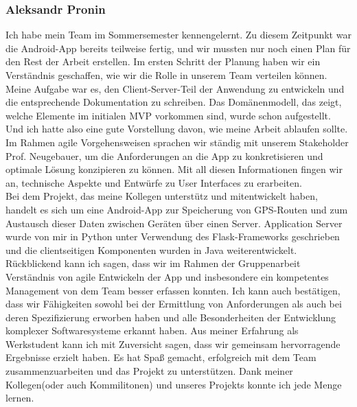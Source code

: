 \documentclass{article}
\begin{document}
\subsubsection{Aleksandr Pronin}
    Ich habe mein Team im Sommersemester kennengelernt. Zu diesem Zeitpunkt war die Android-App bereits teilweise fertig, 
    und wir mussten nur noch einen Plan für den Rest der Arbeit erstellen.
    Im ersten Schritt der Planung haben wir ein Verständnis geschaffen, wie wir die Rolle in unserem Team verteilen können. 
    Meine Aufgabe war es, den Client-Server-Teil der Anwendung zu entwickeln und die entsprechende Dokumentation zu schreiben. 
    Das Domänenmodell, das zeigt, welche Elemente im initialen MVP vorkommen sind, wurde schon aufgestellt.
    Und ich hatte also eine gute Vorstellung davon, wie meine Arbeit ablaufen sollte.  Im Rahmen agile Vorgehensweisen 
    sprachen wir ständig mit unserem Stakeholder Prof. Neugebauer, um die Anforderungen an die App zu 
    konkretisieren und optimale Lösung konzipieren zu können. Mit all diesen Informationen fingen wir an, technische Aspekte 
    und Entwürfe zu User Interfaces zu erarbeiten. \\
    Bei dem Projekt, das meine Kollegen unterstütz und mitentwickelt haben, handelt es sich um eine Android-App zur 
    Speicherung von GPS-Routen und zum Austausch dieser Daten zwischen Geräten über einen Server. Application Server
    wurde von mir in Python unter Verwendung des Flask-Frameworks geschrieben und die clientseitigen Komponenten wurden 
    in Java weiterentwickelt. Rückblickend kann ich sagen, dass wir im Rahmen der Gruppenarbeit Verständnis von agile 
    Entwickeln der App  und insbesondere ein kompetentes Management von dem Team besser erfassen konnten. Ich kann auch bestätigen,
    dass wir Fähigkeiten sowohl bei der Ermittlung von Anforderungen als auch bei deren Spezifizierung erworben haben und alle
    Besonderheiten der Entwicklung komplexer Softwaresysteme erkannt haben. Aus meiner Erfahrung als Werkstudent kann ich mit Zuversicht sagen,
    dass wir gemeinsam hervorragende Ergebnisse erzielt haben. Es hat Spaß gemacht, erfolgreich mit dem Team zusammenzuarbeiten und das Projekt zu 
    unterstützen. Dank meiner Kollegen(oder auch Kommilitonen) und unseres Projekts konnte ich jede Menge lernen.
\end{document}
